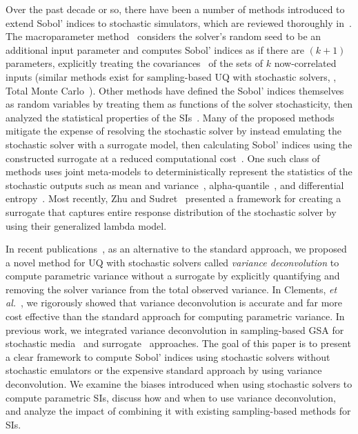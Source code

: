 Over the past decade or so, there have been a number of methods introduced to extend Sobol' indices to stochastic simulators, which are reviewed thoroughly in~\cite{zhu-sudret-2021}.
The macroparameter method~\cite{iooss-ribatet-2009} considers the solver's random seed to be an additional input parameter and computes Sobol' indices as if there are $(k+1)$ parameters, explicitly treating the covariances~\cite{daviega-etal-2009} of the sets of $k$ now-correlated inputs (similar methods exist for sampling-based UQ with stochastic solvers, \eg, Total Monte Carlo~\cite{koning-rochman-2008, koning-rochman-2012}). 
Other methods have defined the Sobol' indices themselves as random variables by treating them as functions of the solver stochasticity, then analyzed the statistical properties of the SIs~\cite{hart-etal-2017, jimenez-etal-2017}. 
Many of the proposed methods mitigate the expense of resolving the stochastic solver by instead emulating the stochastic solver with a surrogate model, then calculating Sobol' indices using the constructed surrogate at a reduced computational cost~\cite{zhu-sudret-2021}.
One such class of methods uses joint meta-models to deterministically represent the statistics of the stochastic outputs such as mean and variance~\cite{iooss-ribatet-2009, marrel-etal-2012}, alpha-quantile~\cite{browne-etal-2016}, and differential entropy~\cite{azzi-etal-2020}.
Most recently, Zhu and Sudret~\cite{zhu-sudret-2021} presented a framework for creating a surrogate that captures entire response distribution of the stochastic solver by using their generalized lambda model.

In recent publications~\cite{olson-2019}, as an alternative to the standard approach, we proposed a novel method for UQ with stochastic solvers called \textit{variance deconvolution} to compute parametric variance without a surrogate by explicitly quantifying and removing the solver variance from the total observed variance.
In Clements, \textit{et al.}~\cite{clements-etal-2024}, we rigorously showed that variance deconvolution is accurate and far more cost effective than the standard approach for computing parametric variance. 
In previous work, we integrated variance deconvolution in sampling-based GSA for stochastic media~\cite{olson-2019} and surrogate~\cite{geraci-olson-2021, geraci-etal-2023} approaches. 
The goal of this paper is to present a clear framework to compute Sobol' indices using stochastic solvers without stochastic emulators or the expensive standard approach by using variance deconvolution. 
We examine the biases introduced when using stochastic solvers to compute parametric SIs, discuss how and when to use variance deconvolution, and analyze the impact of combining it with existing sampling-based methods for SIs.

